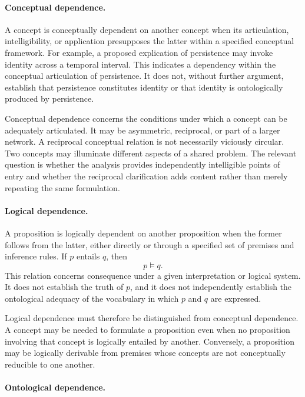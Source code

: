 \paragraph{Conceptual dependence.}

A concept is conceptually dependent on another concept when its
articulation, intelligibility, or application presupposes the latter
within a specified conceptual framework. For example, a proposed
explication of persistence may invoke identity across a temporal
interval. This indicates a dependency within the conceptual
articulation of persistence. It does not, without further argument,
establish that persistence constitutes identity or that identity is
ontologically produced by persistence.

Conceptual dependence concerns the conditions under which a concept
can be adequately articulated. It may be asymmetric, reciprocal, or
part of a larger network. A reciprocal conceptual relation is not
necessarily viciously circular. Two concepts may illuminate different
aspects of a shared problem. The relevant question is whether the
analysis provides independently intelligible points of entry and
whether the reciprocal clarification adds content rather than merely
repeating the same formulation.

\paragraph{Logical dependence.}

A proposition is logically dependent on another proposition when the
former follows from the latter, either directly or through a specified
set of premises and inference rules. If \(p\) entails \(q\), then
\[
  p \models q.
\]
This relation concerns consequence under a given interpretation or
logical system. It does not establish the truth of \(p\), and it does
not independently establish the ontological adequacy of the
vocabulary in which \(p\) and \(q\) are expressed.

Logical dependence must therefore be distinguished from conceptual
dependence. A concept may be needed to formulate a proposition even
when no proposition involving that concept is logically entailed by
another. Conversely, a proposition may be logically derivable from
premises whose concepts are not conceptually reducible to one another.

\paragraph{Ontological dependence.}

